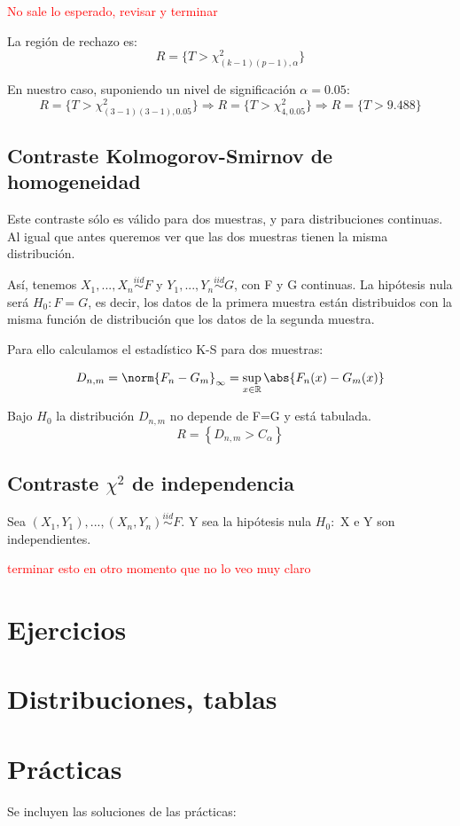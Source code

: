 \documentclass[nochap]{apuntes}
\begin{document}
\begin{example}
\textcolor{red}{No sale lo esperado, revisar y terminar}

La región de rechazo es:
$$ R=\{T > \chi^2_{(k-1)(p-1),\alpha}\}$$

En nuestro caso, suponiendo un nivel de significación $\alpha=0.05$:
$$ R=\{T > \chi^2_{(3-1)(3-1),0.05}\} \Rightarrow R=\{T > \chi^2_{4,0.05}\} \Rightarrow  R=\{T > 9.488\}$$
\end{example}

\section{Contraste Kolmogorov-Smirnov de homogeneidad}
Este contraste sólo es válido para dos muestras, y para distribuciones continuas. Al igual que antes queremos ver que las dos muestras tienen la misma distribución.

Así, tenemos $X_1,...,X_n \stackrel{iid}{\sim} F$ y $Y_1,...,Y_n \stackrel{iid}{\sim} G$, con F y G continuas. La hipótesis nula será $H_0: F=G$, es decir, los datos de la primera muestra están distribuidos con la misma función de distribución que los datos de la segunda muestra.

Para ello calculamos el estadístico K-S para dos muestras:

$$D_{n,m} = \norm{F_n -G_m}_{\infty} = \sup_{x \in \mathbb{R}} \abs{F_n(x)-G_m(x)}  $$

Bajo $H_0$ la distribución $D_{n,m}$ no depende de F=G y está tabulada.
$$ R=\left\{D_{n,m} > C_{\alpha}\right\} $$

\section{Contraste $\chi^2$ de independencia}
Sea $(X_1, Y_1),...,(X_n, Y_n) \stackrel{iid}{\sim} F$. Y sea la hipótesis nula $H_0 :$ X e Y son independientes.

\textcolor{red}{terminar esto en otro momento que no lo veo muy claro}

\appendix
\chapter{Ejercicios}


\chapter{Distribuciones, tablas}



\chapter{Prácticas}
Se incluyen las soluciones de las prácticas:


\end{document}
